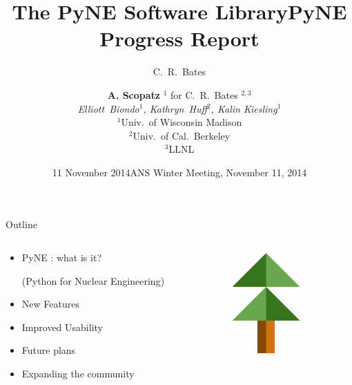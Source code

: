 \documentclass[xcolor=x11names,compress]{beamer}
\title{The PyNE Software Library}
\author{C.\ R.\ Bates}
\date{11 November 2014}
\renewcommand{\(}{\begin{columns}}
\renewcommand{\)}{\end{columns}}
\newcommand{\<}[1]{\begin{column}{#1}}
\renewcommand{\>}{\end{column}}
\begin{document}
\begin{frame}
\title{PyNE Progress Report}
\author{\textbf{A. Scopatz} $^1$ for 
        C.\ R.\ Bates $^{2,3}$ \\
        \textit{Elliott~Biondo$^{1}$, Kathryn~Huff$^{2}$, Kalin Kiesling$^{1}$}\\ 
        $^1$Univ.\ of Wisconsin Madison \\
        $^2$Univ.\ of Cal.\ Berkeley \\
        $^3$LLNL \\}

\date{ANS Winter Meeting, November 11, 2014}
\titlepage
\end{frame}

\begin{frame}{Outline}

	\begin{columns}
  	\begin{column}{0.5\textwidth}
	    \begin{itemize}
        \item PyNE \cite{pyne}: what is it?
        
        (Python for Nuclear Engineering)
        \item New Features
        \item Improved Usability
        \item Future plans
        \item Expanding the community
	    \end{itemize}
  	\end{column}
 	\begin{column}{0.4\textwidth}
 	   \begin{center}
 	   \begin{figure}
       \includegraphics[height=4cm]{pyne-icon-big.png}
	   \end{figure}
 	   \end{center}
  	\end{column}
	\end{columns}

\end{frame}
\end{document}
